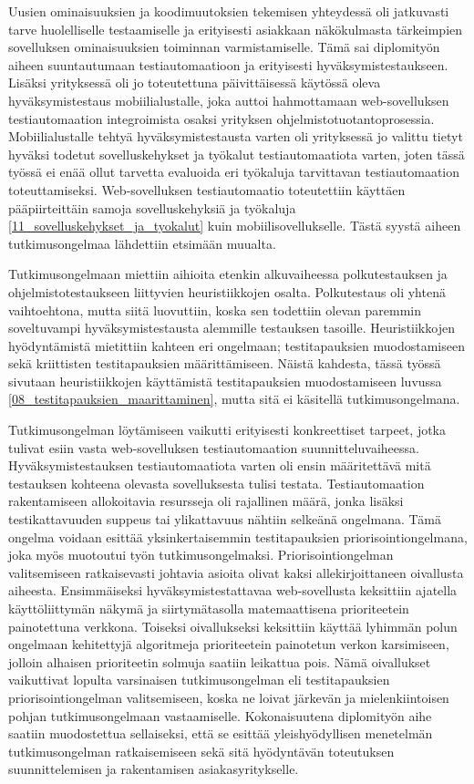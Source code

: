 Uusien ominaisuuksien ja koodimuutoksien tekemisen yhteydessä oli jatkuvasti tarve huolelliselle testaamiselle ja erityisesti asiakkaan näkökulmasta tärkeimpien sovelluksen ominaisuuksien toiminnan varmistamiselle.
Tämä sai diplomityön aiheen suuntautumaan testiautomaatioon ja erityisesti hyväksymistestaukseen.
Lisäksi yrityksessä oli jo toteutettuna päivittäisessä käytössä oleva hyväksymistestaus mobiilialustalle, joka auttoi hahmottamaan web-sovelluksen testiautomaation integroimista osaksi yrityksen ohjelmistotuotantoprosessia.
Mobiilialustalle tehtyä hyväksymistestausta varten oli yrityksessä jo valittu tietyt hyväksi todetut sovelluskehykset ja työkalut testiautomaatiota varten, joten tässä työssä ei enää ollut tarvetta evaluoida eri työkaluja tarvittavan testiautomaation toteuttamiseksi.
Web-sovelluksen testiautomaatio toteutettiin käyttäen pääpiirteittäin samoja sovelluskehyksiä ja työkaluja \ref{11_sovelluskehykset_ja_tyokalut} kuin mobiilisovellukselle.
Tästä syystä aiheen tutkimusongelmaa lähdettiin etsimään muualta.

Tutkimusongelmaan miettiin aihioita etenkin alkuvaiheessa polkutestauksen ja ohjelmistotestaukseen liittyvien heuristiikkojen osalta.
Polkutestaus oli yhtenä vaihtoehtona, mutta siitä luovuttiin, koska sen todettiin olevan paremmin soveltuvampi hyväksymistestausta alemmille testauksen tasoille.
Heuristiikkojen hyödyntämistä mietittiin kahteen eri ongelmaan; testitapauksien muodostamiseen sekä kriittisten testitapauksien määrittämiseen.
Näistä kahdesta, tässä työssä sivutaan heuristiikkojen käyttämistä testitapauksien muodostamiseen luvussa \ref{08_testitapauksien_maarittaminen}, mutta sitä ei käsitellä tutkimusongelmana.

Tutkimusongelman löytämiseen vaikutti erityisesti konkreettiset tarpeet, jotka tulivat esiin vasta web-sovelluksen testiautomaation suunnitteluvaiheessa.
Hyväksymistestauksen testiautomaatiota varten oli ensin määritettävä mitä testauksen kohteena olevasta sovelluksesta tulisi testata.
Testiautomaation rakentamiseen allokoitavia resursseja oli rajallinen määrä, jonka lisäksi testikattavuuden suppeus tai ylikattavuus nähtiin selkeänä ongelmana.
Tämä ongelma voidaan esittää yksinkertaisemmin testitapauksien priorisointiongelmana, joka myös muotoutui työn tutkimusongelmaksi.
Priorisointiongelman valitsemiseen ratkaisevasti johtavia asioita olivat kaksi allekirjoittaneen oivallusta aiheesta.
Ensimmäiseksi hyväksymistestattavaa web-sovellusta keksittiin ajatella käyttöliittymän näkymä ja siirtymätasolla matemaattisena prioriteetein painotettuna verkkona.
Toiseksi oivallukseksi keksittiin käyttää lyhimmän polun ongelmaan kehitettyjä algoritmeja prioriteetein painotetun verkon karsimiseen, jolloin alhaisen prioriteetin solmuja saatiin leikattua pois.
Nämä oivallukset vaikuttivat lopulta varsinaisen tutkimusongelman eli testitapauksien priorisointiongelman valitsemiseen, koska ne loivat järkevän ja mielenkiintoisen pohjan tutkimusongelmaan vastaamiselle.
Kokonaisuutena diplomityön aihe saatiin muodostettua sellaiseksi, että se esittää yleishyödyllisen menetelmän tutkimusongelman ratkaisemiseen sekä sitä hyödyntävän toteutuksen suunnittelemisen ja rakentamisen asiakasyritykselle.

